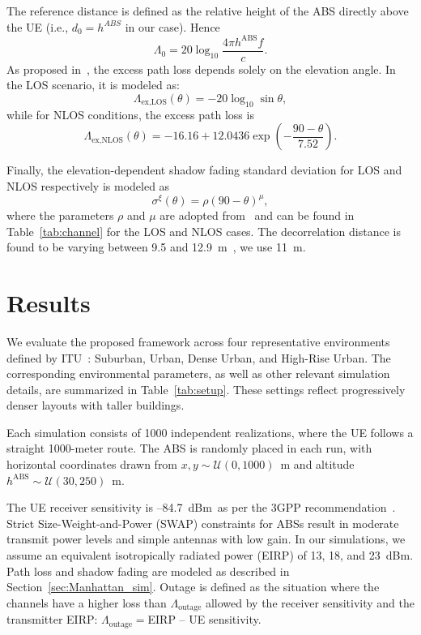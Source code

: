 \documentclass[10pt,conference]{IEEEtran}
\begin{document}
The reference distance is defined as the relative height of the ABS directly above the UE (i.e., $d_0=h^{ABS}$ in our case). Hence
\begin{equation}\label{eq:refPL}
	\Lambda_0=20 \log_{10}\frac{{4\pi h^{\text{ABS}} f}}{c}. \end{equation}
As proposed in~\cite{Feng2006a2gPL}, the excess path loss depends solely on the elevation angle. In the LOS scenario, it is modeled as:
\begin{equation}
\Lambda_{\text{ex,LOS}}(\theta) = -20 \log_{10} \sin \theta,
\end{equation}
while for NLOS conditions, the excess path loss is
\begin{equation}
	\Lambda_{\text{ex,NLOS}}(\theta) = -16.16 + 12.0436 \exp(-\frac{90-\theta}{7.52}).
\end{equation}

Finally, the elevation-dependent shadow fading standard deviation for LOS and NLOS respectively is modeled as
\begin{equation}
    \sigma^\xi(\theta) = \rho (90-\theta)^\mu,
\end{equation}
where the parameters $\rho$ and $\mu$ are adopted from~\cite{Feng2006a2gPL} and can be found in Table~\ref{tab:channel} for the LOS and NLOS cases. The decorrelation distance is found to be varying between 9.5 and 12.9~m~\cite{Bucur2019LargeScale}, we use 11~m.


\section{Results}\label{sec:results}
We evaluate the proposed framework across four representative environments defined by ITU~\cite{ITU}: Suburban, Urban, Dense Urban, and High-Rise Urban. The corresponding environmental parameters, as well as other relevant simulation details, are summarized in Table~\ref{tab:setup}. These settings reflect progressively denser layouts with taller buildings.

Each simulation consists of 1000 independent realizations, where the UE follows a straight 1000-meter route. The ABS is randomly placed in each run, with horizontal coordinates drawn from $x, y \sim \mathcal{U}(0,1000)$~m and altitude $h^{\text{ABS}} \sim \mathcal{U}(30,250)$~m. 

The UE receiver sensitivity is --84.7~dBm~as per the 3GPP recommendation~\cite{3gppUE}. Strict Size-Weight-and-Power (SWAP) constraints for ABSs result in moderate transmit power levels and simple antennas with low gain. In our simulations, we assume an equivalent isotropically radiated power (EIRP) of 13, 18, and 23~dBm. Path loss and shadow fading are modeled as described in Section~\ref{sec:Manhattan_sim}. Outage is defined as the situation where the channels have a higher loss than $\Lambda_{\text{outage}}$ allowed by the receiver sensitivity and the transmitter EIRP: $\Lambda_{\text{outage}}=$EIRP -- UE sensitivity.
\end{document}
